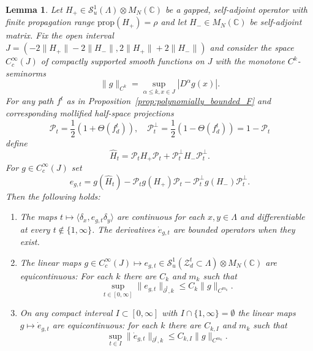 \documentclass[12pt]{amsart}
\newtheorem{lemma}[theorem]{Lemma}
\newcommand{\CM}{{\mathbb C}}
\newcommand{\Ss}{{\mathcal S}}
\newcommand{\Zz}{{\mathcal Z}}
\newcommand{\pdv}{\partial}
\newcommand{\scalarmatrix}{H_-}
\begin{document}
\begin{lemma}\label{lem:technical_homotopy}
Let $H_+ \in \Ss_u^1(\Lambda) \otimes M_N(\CM)$ be a gapped, self-adjoint operator with finite propagation range $\mathrm{prop}(H_+)=\rho$ and let $\scalarmatrix \in  M_N(\CM)$ be self-adjoint matrix. Fix the open interval $J=(-2\|H_+ \|-2\|\scalarmatrix\|, 2\|H_+\|+ 2\|\scalarmatrix\|)$ and consider the space $C_c^\infty(J)$ of compactly supported smooth functions on $J$ with the monotone $C^k$-seminorms $$\|g\|_{C^k}=\sup_{\alpha\leq k, x\in J}|D^\alpha g(x)|.$$
For any path $f^{t}$ as in Proposition~\ref{prop:polynomially_bounded_F} and corresponding mollified half-space projections
\[\mathcal{P}_t= \frac12\left(1+\Theta(f_d^t)\right), \quad \mathcal{P}^\perp_t= \frac12\left(1-\Theta(f_d^t)\right)=1-\mathcal{P}_t\]
define 
$$\hat{H}_t = \mathcal{P}_t H_+ \mathcal{P}_t + \mathcal{P}_t^\perp \scalarmatrix \mathcal{P}_t^\perp.$$
For $g\in C^\infty_c(J)$ set
$$e_{g,t}= g(\hat{H}_t)-\mathcal{P}_t g(H_+) \mathcal{P}_t - \mathcal{P}_t^\perp g(\scalarmatrix)\mathcal{P}_t^\perp.$$
Then the following holds:
\begin{enumerate}
    \item[(i)] The maps $t\mapsto \langle \delta_x,e_{g,t}\delta_y\rangle$ are continuous for each $x,y\in \Lambda$ and differentiable at every $t \notin \{1,\infty\}$. The derivatives $\dot{e}_{g,t}$ are bounded operators when they exist.
    \item[(ii)] 
    The linear maps $g \in C^\infty_c(J)\mapsto e_{g,t} \in \Ss^1_u(\Zz_d^t\subset \Lambda)\otimes M_N(\CM)$ are equicontinuous: For each $k$ there are $C_k$ and $m_k$ such that
    $$\sup_{t\in [0,\infty]} \|e_{g,t}\|_{\pdv^t,k}\leq C_k \|g\|_{C^{m_k}}.$$
    \item[(iii)] On any compact interval $I\subset [0,\infty]$ with $I\cap \{1,\infty\}=\emptyset$ the linear maps $g\mapsto \dot{e}_{g,t}$ are equicontinuous: for each $k$ there are $C_{k,I}$ and $m_k$ such that
    $$\sup_{t\in I} \|\dot{e}_{g,t}\|_{\pdv^t,k}\leq C_{k,I}\|g\|_{C^{m_k}}.$$
\end{enumerate}

\end{lemma}
\end{document}

